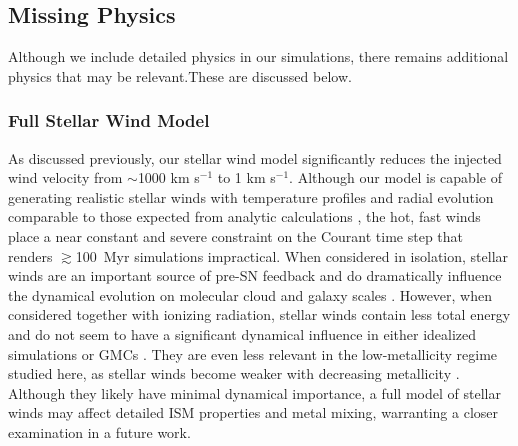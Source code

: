 \documentclass[twocolumn]{aastex61}
\begin{document}
\subsection{Missing Physics}
Although we include detailed physics in our simulations, there remains additional physics that may be relevant.These are discussed below.

\subsubsection{Full Stellar Wind Model}
\label{sec:stellar winds discussion}
As discussed previously, our stellar wind model significantly reduces the injected wind velocity from $\sim$1000 km s$^{-1}$ to 1 km s$^{-1}$. Although our model is capable of generating realistic stellar winds with temperature profiles and radial evolution comparable to those expected from analytic calculations \citep{Weaver1977}, the hot, fast winds place a near constant and severe constraint on the Courant time step that renders $\gtrsim$100~Myr simulations impractical. When considered in isolation, stellar winds are an important source of pre-SN feedback and do dramatically influence the dynamical evolution on molecular cloud and galaxy scales \citep{Dale2008,Peters2017,Gatto2017}. However, when considered together with ionizing radiation, stellar winds contain less total energy \citep{Agertz2013} and do not seem to have a significant dynamical influence in either idealized simulations \citep{Geen2015} or GMCs \citep{Dale2014}. They are even less relevant in the low-metallicity regime studied here, as stellar winds become weaker with decreasing metallicity \citep{Puls2000, Vink2005}. Although they likely have minimal dynamical importance, a full model of stellar winds may affect detailed ISM properties and metal mixing, warranting a closer examination in a future work.

\end{document}
